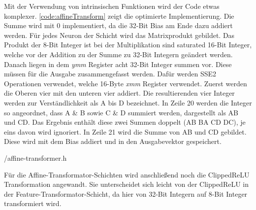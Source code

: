 Mit der Verwendung von intrinsischen Funktionen wird der Code etwas komplexer. \autoref{code:affineTransform} zeigt die optimierte Implementierung. Die Summe wird mit 0 implementiert, da die 32-Bit Bias am Ende dazu addiert werden. Für jedes Neuron der Schicht wird das Matrixprodukt gebildet. Das Produkt der 8-Bit Integer ist bei der Multiplikation sind saturated 16-Bit Integer, welche vor der Addition zu der Summe zu 32-Bit Integern geändert werden. Danach liegen in dem \emph{ymm} Register acht 32-Bit Integer summen vor. Diese müssen für die Ausgabe zusammengefasst werden. Dafür werden \ac{SSE2} Operationen verwendet, welche 16-Byte \emph{xmm} Register verwendet. Zuerst werden die Oberen vier mit den unteren vier addiert. Die resultierenden vier Integer werden zur Verständlichkeit als A bis D bezeichnet. In Zeile 20 werden die Integer so angeordnet, dass A \& B sowie C \& D summiert werden, dargestellt als AB und CD. Das Ergebnis enthält diese zwei Summen doppelt (AB BA CD DC), je eins davon wird ignoriert. In Zeile 21 wird die Summe von AB und CD gebildet. Diese wird mit dem Bias addiert und in den Ausgabevektor gespeichert.


{\srcloc/affine-transformer.h}

Für die Affine-Transformator-Schichten wird anschließend noch die Clipped\ac{ReLU} Transformation angewandt. Sie unterscheidet sich leicht von der Clipped\ac{ReLU} in der Feature-Transformator-Schicht, da hier von 32-Bit Integern auf 8-Bit Integer transformiert wird.
